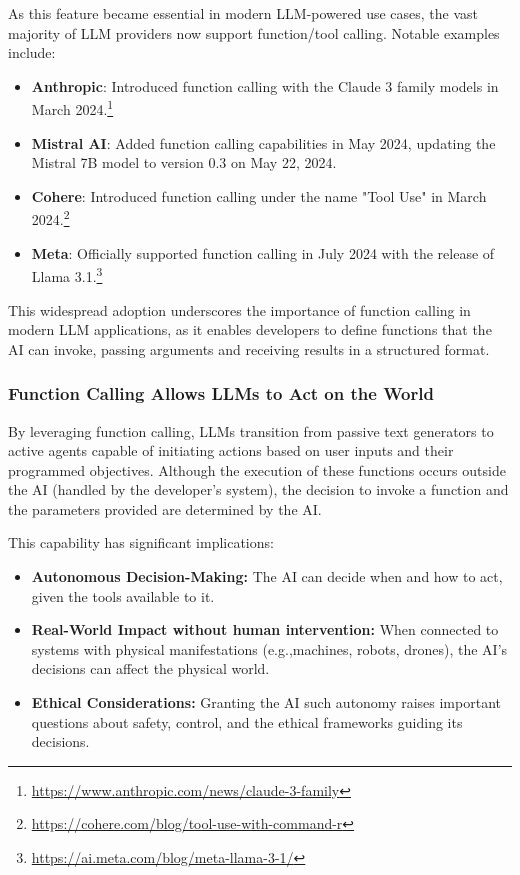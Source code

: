 As this feature became essential in modern LLM-powered use cases, the vast majority of LLM providers now support function/tool calling. Notable examples include:
\begin{itemize}
    \item \textbf{Anthropic}: Introduced function calling with the Claude 3 family models in March 2024.\footnote{\url{https://www.anthropic.com/news/claude-3-family}}
    \item \textbf{Mistral AI}: Added function calling capabilities in May 2024, updating the Mistral 7B model to version 0.3 on May 22, 2024.
    \item \textbf{Cohere}: Introduced function calling under the name "Tool Use" in March 2024.\footnote{\url{https://cohere.com/blog/tool-use-with-command-r}}
    \item \textbf{Meta}: Officially supported function calling in July 2024 with the release of Llama 3.1.\footnote{\url{https://ai.meta.com/blog/meta-llama-3-1/}}
\end{itemize}

This widespread adoption underscores the importance of function calling in modern LLM applications, as it enables developers to define functions that the AI can invoke, passing arguments and receiving results in a structured format.


\subsubsection{Function Calling Allows LLMs to Act on the World}

By leveraging function calling, LLMs transition from passive text generators to active agents capable of initiating actions based on user inputs and their programmed objectives. Although the execution of these functions occurs outside the AI (handled by the developer's system), the decision to invoke a function and the parameters provided are determined by the AI.

This capability has significant implications:

\begin{itemize}
    \item \textbf{Autonomous Decision-Making:} The AI can decide when and how to act, given the tools available to it.
    \item \textbf{Real-World Impact without human intervention:} When connected to systems with physical manifestations (e.g.,machines, robots, drones), the AI's decisions can affect the physical world.
    \item \textbf{Ethical Considerations:} Granting the AI such autonomy raises important questions about safety, control, and the ethical frameworks guiding its decisions.
\end{itemize}

